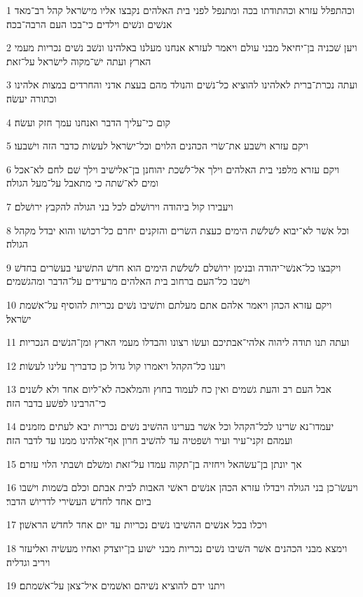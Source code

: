\par 1 וכהתפלל עזרא וכהתודתו בכה ומתנפל לפני בית האלהים נקבצו אליו מישׂראל קהל רב־מאד אנשׁים ונשׁים וילדים כי־בכו העם הרבה־בכה׃
\par 2 ויען שׁכניה בן־יחיאל מבני עולם ויאמר לעזרא אנחנו מעלנו באלהינו ונשׁב נשׁים נכריות מעמי הארץ ועתה ישׁ־מקוה לישׂראל על־זאת׃
\par 3 ועתה נכרת־ברית לאלהינו להוציא כל־נשׁים והנולד מהם בעצת אדני והחרדים במצות אלהינו וכתורה יעשׂה׃
\par 4 קום כי־עליך הדבר ואנחנו עמך חזק ועשׂה׃
\par 5 ויקם עזרא וישׁבע את־שׂרי הכהנים הלוים וכל־ישׂראל לעשׂות כדבר הזה וישׁבעו׃
\par 6 ויקם עזרא מלפני בית האלהים וילך אל־לשׁכת יהוחנן בן־אלישׁיב וילך שׁם לחם לא־אכל ומים לא־שׁתה כי מתאבל על־מעל הגולה׃
\par 7 ויעבירו קול ביהודה וירושׁלם לכל בני הגולה להקבץ ירושׁלם׃
\par 8 וכל אשׁר לא־יבוא לשׁלשׁת הימים כעצת השׂרים והזקנים יחרם כל־רכושׁו והוא יבדל מקהל הגולה׃
\par 9 ויקבצו כל־אנשׁי־יהודה ובנימן ירושׁלם לשׁלשׁת הימים הוא חדשׁ התשׁיעי בעשׂרים בחדשׁ וישׁבו כל־העם ברחוב בית האלהים מרעידים על־הדבר ומהגשׁמים׃
\par 10 ויקם עזרא הכהן ויאמר אלהם אתם מעלתם ותשׁיבו נשׁים נכריות להוסיף על־אשׁמת ישׂראל׃
\par 11 ועתה תנו תודה ליהוה אלהי־אבתיכם ועשׂו רצונו והבדלו מעמי הארץ ומן־הנשׁים הנכריות׃
\par 12 ויענו כל־הקהל ויאמרו קול גדול כן כדבריך עלינו לעשׂות׃
\par 13 אבל העם רב והעת גשׁמים ואין כח לעמוד בחוץ והמלאכה לא־ליום אחד ולא לשׁנים כי־הרבינו לפשׁע בדבר הזה׃
\par 14 יעמדו־נא שׂרינו לכל־הקהל וכל אשׁר בערינו ההשׁיב נשׁים נכריות יבא לעתים מזמנים ועמהם זקני־עיר ועיר ושׁפטיה עד להשׁיב חרון אף־אלהינו ממנו עד לדבר הזה׃
\par 15 אך יונתן בן־עשׂהאל ויחזיה בן־תקוה עמדו על־זאת ומשׁלם ושׁבתי הלוי עזרם׃
\par 16 ויעשׂו־כן בני הגולה ויבדלו עזרא הכהן אנשׁים ראשׁי האבות לבית אבתם וכלם בשׁמות וישׁבו ביום אחד לחדשׁ העשׂירי לדריושׁ הדבר׃
\par 17 ויכלו בכל אנשׁים ההשׁיבו נשׁים נכריות עד יום אחד לחדשׁ הראשׁון׃
\par 18 וימצא מבני הכהנים אשׁר השׁיבו נשׁים נכריות מבני ישׁוע בן־יוצדק ואחיו מעשׂיה ואליעזר ויריב וגדליה׃
\par 19 ויתנו ידם להוציא נשׁיהם ואשׁמים איל־צאן על־אשׁמתם׃
